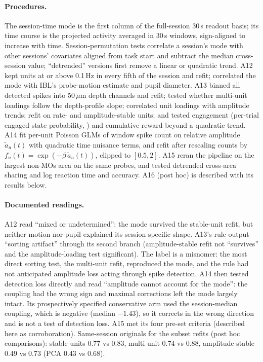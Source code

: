 \documentclass{article}
\begin{document}
\paragraph{Procedures.} The session-time mode is the first column of the full-session 30\,s readout basis; its time
course is the projected activity averaged in 30\,s windows, sign-aligned to increase with time. Session-permutation
tests correlate a session's mode with other sessions' covariates aligned from task start and subtract the median
cross-session value; ``detrended'' versions first remove a linear or quadratic trend. A12 kept units at or above
0.1\,Hz in every fifth of the session and refit; correlated the mode with IBL's probe-motion estimate and pupil
diameter. A13 binned all detected spikes into 50\,$\mu$m depth channels and refit; tested whether multi-unit loadings
follow the depth-profile slope; correlated unit loadings with amplitude trends; refit on rate- and amplitude-stable
units; and tested engagement (per-trial engaged-state probability, \citealp{iblengage}) and cumulative reward beyond a
quadratic trend. A14 fit per-unit Poisson GLMs of window spike count on relative amplitude $\tilde a_u(t)$ with
quadratic time nuisance terms, and refit after rescaling counts by $f_u(t)=\exp(-\beta\,\tilde a_u(t))$, clipped to
$[0.5, 2]$. A15 reran the pipeline on the largest non-MOs area on the same probes, and tested detrended cross-area
sharing and log reaction time and accuracy. A16 (post hoc) is described with its results below.

\paragraph{Documented readings.} A12 read ``mixed or undetermined'': the mode survived the stable-unit refit, but
neither motion nor pupil explained its session-specific shape. A13's rule output ``sorting artifact'' through its
second branch (amplitude-stable refit not ``survives'' and the amplitude-loading test significant). The label is a
misnomer: the most direct sorting test, the multi-unit refit, reproduced the mode, and the rule had not anticipated
amplitude loss acting through spike detection. A14 then tested detection loss directly and read ``amplitude cannot
account for the mode'': the coupling had the wrong sign and maximal corrections left the mode largely intact. Its
prospectively specified conservative arm used the session-median coupling, which is negative (median $-1.43$), so it corrects in
the wrong direction and is not a test of detection loss. A15 met its four pre-set criteria (described here as corroboration).
Same-session originals for the subset refits (post hoc comparisons): stable units 0.77 vs 0.83, multi-unit 0.74 vs
0.88, amplitude-stable 0.49 vs 0.73 (PCA 0.43 vs 0.68).
\end{document}
